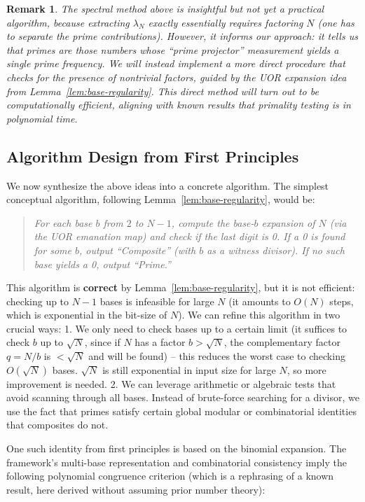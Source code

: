 \documentclass[11pt]{article}
\newtheorem{remark}{Remark}
\begin{document}
\begin{remark}
The spectral method above is insightful but not yet a practical algorithm, because extracting $\lambda_N$ exactly essentially requires factoring $N$ (one has to separate the prime contributions). However, it informs our approach: it tells us that primes are those numbers whose “prime projector” measurement yields a single prime frequency. We will instead implement a more direct procedure that checks for the presence of nontrivial factors, guided by the UOR expansion idea from Lemma~\ref{lem:base-regularity}. This direct method will turn out to be computationally efficient, aligning with known results that primality testing is in polynomial time.
\end{remark}

\subsection{Algorithm Design from First Principles}
We now synthesize the above ideas into a concrete algorithm. The simplest conceptual algorithm, following Lemma~\ref{lem:base-regularity}, would be:

\begin{quote}
\emph{For each base $b$ from $2$ to $N-1$, compute the base-$b$ expansion of $N$ (via the UOR emanation map) and check if the last digit is 0. If a 0 is found for some $b$, output “Composite” (with $b$ as a witness divisor). If no such base yields a 0, output “Prime.”}
\end{quote}

This algorithm is \textbf{correct} by Lemma~\ref{lem:base-regularity}, but it is not efficient: checking up to $N-1$ bases is infeasible for large $N$ (it amounts to $O(N)$ steps, which is exponential in the bit-size of $N$). We can refine this algorithm in two crucial ways:
1. We only need to check bases up to a certain limit (it suffices to check $b$ up to $\sqrt{N}$, since if $N$ has a factor $b > \sqrt{N}$, the complementary factor $q = N/b$ is $< \sqrt{N}$ and will be found) – this reduces the worst case to checking $O(\sqrt{N})$ bases. $\sqrt{N}$ is still exponential in input size for large $N$, so more improvement is needed.
2. We can leverage arithmetic or algebraic tests that avoid scanning through all bases. Instead of brute-force searching for a divisor, we use the fact that primes satisfy certain global modular or combinatorial identities that composites do not.

One such identity from first principles is based on the binomial expansion. The framework’s multi-base representation and combinatorial consistency imply the following polynomial congruence criterion (which is a rephrasing of a known result, here derived without assuming prior number theory):
\end{document}
